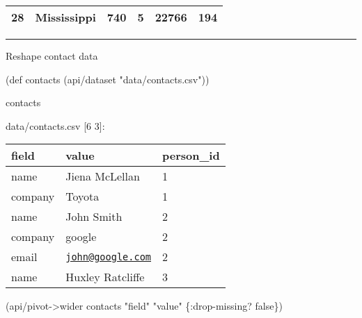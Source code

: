 \documentclass[]{article}
\newenvironment{Shaded}{\begin{snugshade}}{\end{snugshade}}
\newcommand{\AttributeTok}[1]{\textcolor[rgb]{0.77,0.63,0.00}{#1}}
\newcommand{\BuiltInTok}[1]{#1}
\newcommand{\FunctionTok}[1]{\textcolor[rgb]{0.00,0.00,0.00}{#1}}
\newcommand{\NormalTok}[1]{#1}
\newcommand{\StringTok}[1]{\textcolor[rgb]{0.31,0.60,0.02}{#1}}
\newcommand{\VariableTok}[1]{\textcolor[rgb]{0.00,0.00,0.00}{#1}}
\begin{document}
\begin{longtable}[]{@{}llllll@{}}
\begin{minipage}[t]{0.05\columnwidth}\raggedright
28\strut
\end{minipage} & \begin{minipage}[t]{0.17\columnwidth}\raggedright
Mississippi\strut
\end{minipage} & \begin{minipage}[t]{0.16\columnwidth}\raggedright
740\strut
\end{minipage} & \begin{minipage}[t]{0.12\columnwidth}\raggedright
5\strut
\end{minipage} & \begin{minipage}[t]{0.18\columnwidth}\raggedright
22766\strut
\end{minipage} & \begin{minipage}[t]{0.14\columnwidth}\raggedright
194\strut
\end{minipage}\tabularnewline
\bottomrule
\end{longtable}

\begin{center}\rule{0.5\linewidth}{0.5pt}\end{center}

Reshape contact data

\begin{Shaded}
\begin{Highlighting}[]
\NormalTok{(}\BuiltInTok{def}\FunctionTok{ contacts }\NormalTok{(api/dataset }\StringTok{"data/contacts.csv"}\NormalTok{))}
\end{Highlighting}
\end{Shaded}

\begin{Shaded}
\begin{Highlighting}[]
\NormalTok{contacts}
\end{Highlighting}
\end{Shaded}

data/contacts.csv {[}6 3{]}:

\begin{longtable}[]{@{}lll@{}}
\toprule
field & value & person\_id\tabularnewline
\midrule
\endhead
name & Jiena McLellan & 1\tabularnewline
company & Toyota & 1\tabularnewline
name & John Smith & 2\tabularnewline
company & google & 2\tabularnewline
email & \href{mailto:john@google.com}{\nolinkurl{john@google.com}} &
2\tabularnewline
name & Huxley Ratcliffe & 3\tabularnewline
\bottomrule
\end{longtable}

\begin{Shaded}
\begin{Highlighting}[]
\NormalTok{(api/pivot->wider contacts }\StringTok{"field"} \StringTok{"value"}\NormalTok{ \{}\AttributeTok{:drop-missing}\NormalTok{? }\VariableTok{false}\NormalTok{\})}
\end{Highlighting}
\end{Shaded}
\end{document}
